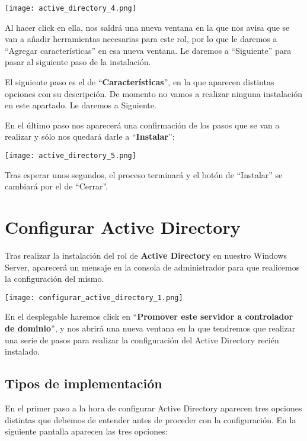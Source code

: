 \begin{center}
    \vspace{-15pt}
    \texttt{[image: active\_directory\_4.png]}
    \vspace{-15pt}
\end{center}

Al hacer click en ella, nos saldrá una nueva ventana en la que nos avisa que se van a añadir herramientas necesarias para este rol, por lo que le daremos a “Agregar características” en esa nueva ventana. Le daremos a “Siguiente” para pasar al siguiente paso de la instalación.

El siguiente paso es el de “\textbf{Características}”, en la que aparecen distintas opciones con su descripción. De momento no vamos a realizar ninguna instalación en este apartado. Le daremos a Siguiente.

En el último paso nos aparecerá una confirmación de los pasos que se van a realizar y sólo nos quedará darle a “\textbf{Instalar}”:

\begin{center}
    \vspace{-15pt}
    \texttt{[image: active\_directory\_5.png]}
    \vspace{-15pt}
\end{center}

Tras esperar unos segundos, el proceso terminará y el botón de “Instalar” se cambiará por el de “Cerrar”.

\section{Configurar Active Directory}
Tras realizar la instalación del rol de \textbf{Active Directory} en nuestro Windows Server, aparecerá un mensaje en la consola de administrador para que realicemos la configuración del mismo.

\begin{tcolorbox}[title=Panel de administración para configurar Active Directory]
    \centering
    \texttt{[image: configurar\_active\_directory\_1.png]}
\end{tcolorbox}

En el desplegable haremos click en “\textbf{Promover este servidor a controlador de dominio}”, y nos abrirá una nueva ventana en la que tendremos que realizar una serie de pasos para realizar la configuración del Active Directory recién instalado.


\subsection{Tipos de implementación}
En el primer paso a la hora de configurar Active Directory aparecen tres opciones distintas que debemos de entender antes de proceder con la configuración. En la siguiente pantalla aparecen las tres opciones:

